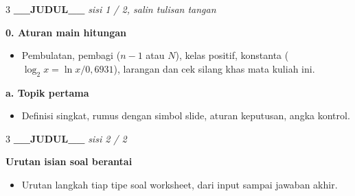 \documentclass[8pt]{extarticle}
\newcommand{\sect}[1]{\par\vspace{1.5pt}\colorbox{black!12}{\parbox{\dimexpr\columnwidth-2\fboxsep}{\textbf{#1}}}\par\vspace{0.8pt}}
\begin{document}
\fontsize{7.9}{9.0}\selectfont\raggedright\setlength{\emergencystretch}{1em}
\begin{multicols*}{3}
\textbf{__JUDUL__} \hfill \textit{sisi 1 / 2, salin tulisan tangan}\par
\sect{0. Aturan main hitungan}
\begin{itemize}
\item Pembulatan, pembagi ($n-1$ atau $N$), kelas positif, konstanta ($\log_2x=\ln x/0{,}6931$), larangan dan cek silang khas mata kuliah ini.
\end{itemize}
\sect{a. Topik pertama}
\begin{itemize}
\item Definisi singkat, rumus dengan simbol slide, aturan keputusan, angka kontrol.
\end{itemize}
\end{multicols*}
\newpage
\begin{multicols*}{3}
\textbf{__JUDUL__} \hfill \textit{sisi 2 / 2}\par
\sect{Urutan isian soal berantai}
\begin{itemize}
\item Urutan langkah tiap tipe soal worksheet, dari input sampai jawaban akhir.
\end{itemize}
\end{multicols*}
\end{document}

